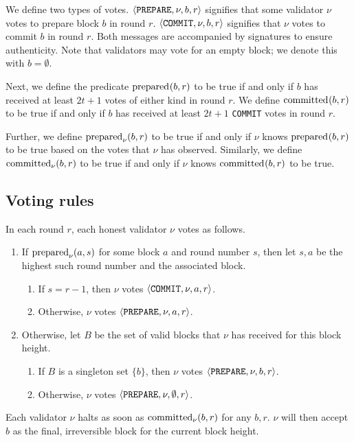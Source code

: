 We define two types of votes. $\preparevote{\nu, b, r}$ signifies that some validator $\nu$ votes to prepare block $b$ in round $r$. $\commitvote{\nu, b, r}$ signifies that $\nu$ votes to commit $b$ in round $r$. Both messages are accompanied by signatures to ensure authenticity. Note that validators may vote for an empty block; we denote this with $b = \emptyset$.

Next, we define the predicate $\prepared{b, r}$ to be true if and only if $b$ has received at least $2t + 1$ votes of either kind in round $r$. We define $\committed{b, r}$ to be true if and only if $b$ has received at least $2t + 1$ \texttt{COMMIT} votes in round $r$.

Further, we define $\prepared[\nu]{b, r}$ to be true if and only if $\nu$ knows $\prepared{b, r}$ to be true based on the votes that $\nu$ has observed. Similarly, we define $\committed[\nu]{b, r}$ to be true if and only if $\nu$ knows $\committed{b, r}$ to be true.


\subsection{Voting rules}

In each round $r$, each honest validator $\nu$ votes as follows.
\begin{enumerate}
  \item If $\prepared[\nu]{a, s}$ for some block $a$ and round number $s$, then let $s, a$ be the highest such round number and the associated block.
    \begin{enumerate}
      \item If $s = r - 1$, then $\nu$ votes $\commitvote{\nu, a, r}$.
      \item Otherwise, $\nu$ votes $\preparevote{\nu, a, r}$.
    \end{enumerate}
  \item Otherwise, let $B$ be the set of valid blocks that $\nu$ has received for this block height.
    \begin{enumerate}
      \item If $B$ is a singleton set $\{ b \}$, then $\nu$ votes $\preparevote{\nu, b, r}$.
      \item Otherwise, $\nu$ votes $\preparevote{\nu, \emptyset, r}$.
    \end{enumerate}
\end{enumerate}
Each validator $\nu$ halts as soon as $\committed[\nu]{b, r}$ for any $b, r$. $\nu$ will then accept $b$ as the final, irreversible block for the current block height.


